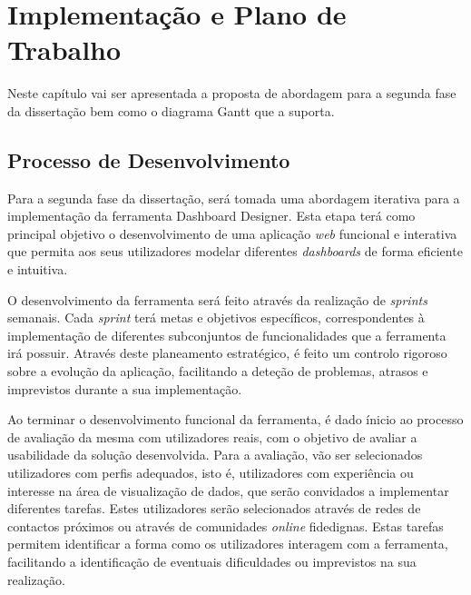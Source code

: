 
%

\chapter{Implementação e Plano de Trabalho}
\label{cha:abordagem_plano}

Neste capítulo vai ser apresentada a proposta de abordagem para a segunda fase da dissertação bem como o diagrama Gantt que a suporta. 

\section{Processo de Desenvolvimento} %
\label{sec:tecnologias_processo}

Para a segunda fase da dissertação, será tomada uma abordagem iterativa para a implementação da ferramenta Dashboard Designer. Esta etapa terá como principal objetivo o desenvolvimento de uma aplicação \textit{web} funcional e interativa que permita aos seus utilizadores modelar diferentes \textit{dashboards} de forma eficiente e intuitiva.

O desenvolvimento da ferramenta será feito através da realização de \textit{sprints} semanais. Cada \textit{sprint} terá metas e objetivos específicos, correspondentes à implementação de diferentes subconjuntos de funcionalidades que a ferramenta irá possuir. Através deste planeamento estratégico, é feito um controlo rigoroso sobre a evolução da aplicação, facilitando a deteção de problemas, atrasos e imprevistos durante a sua implementação.

Ao terminar o desenvolvimento funcional da ferramenta, é dado ínicio ao processo de avaliação da mesma com utilizadores reais, com o objetivo de avaliar a usabilidade da solução desenvolvida. Para a avaliação, vão ser selecionados utilizadores com perfis adequados, isto é, utilizadores com experiência ou interesse na área de visualização de dados, que serão convidados a implementar diferentes tarefas. Estes utilizadores serão selecionados através de redes de contactos próximos ou através de comunidades \textit{online} fidedignas. Estas tarefas permitem identificar a forma como os utilizadores interagem com a ferramenta, facilitando a identificação de eventuais dificuldades ou imprevistos na sua realização.

